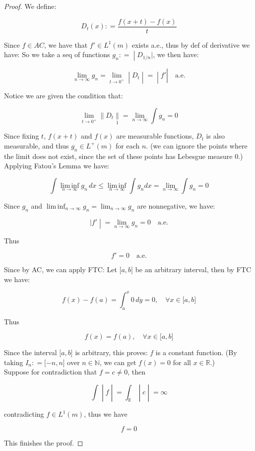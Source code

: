 \documentclass{qlnotes-export}
\begin{document}
\begin{proof}

We define:

\[D_{t}(x): = \frac{f(x + t) - f(x)}{t}\]

Since \(f \in AC\), we have that \(f' \in L^{1}(m)\) exists a.e., thus by def of derivative we have: So we take a seq of functions \(\left. g_{n}: = \middle| D_{1/n}| \right.\), we then have:

\[\left. \lim\limits_{n\rightarrow\infty}g_{n} = \lim\limits_{t\rightarrow 0^{+}} \middle| D_{t} \middle| = \middle| f' \right|\quad\text{a.e.}\]

Notice we are given the condition that:

\[\lim\limits_{t\rightarrow 0^{+}} \parallel D_{t}\underset{1}{\parallel} = \lim\limits_{n\rightarrow\infty}\int g_{n} = 0\]

Since fixing \(t\), \(f(x + t)\) and \(f(x)\) are measurable functions, \(D_{t}\) is also measurable, and thus \(g_{n} \in L^{+}(m)\) for each \(n\). (we can ignore the points where the limit does not exist, since the set of these points has Lebesgue measure \(0\).)\\
Applying Fatou's Lemma we have:

\[\int\operatorname{lim\, inf}\limits_{n\rightarrow\infty}g_{n}\, dx \leq \operatorname{lim\, inf}\limits_{n\rightarrow\infty}\int g_{n}dx = \lim\limits_{n\rightarrow\infty}\int g_{n} = 0\]

Since \(g_{n}\) and \(\operatorname{lim\, inf}_{n\rightarrow\infty}g_{n} = \lim_{n\rightarrow\infty}g_{n}\) are nonnegative, we have:

\[\left. |f' \middle| = \lim\limits_{n\rightarrow\infty}g_{n} = 0\quad\text{a.e.} \right.\]

Thus

\[f' = 0\quad\text{a.e.}\]

Since by AC, we can apply FTC: Let \(\lbrack a,b\rbrack\) be an arbitrary interval, then by FTC we have:

\[f(x) - f(a) = \int_{a}^{x}0\, dy = 0,\quad\forall x \in \lbrack a,b\rbrack\]

Thus

\[f(x) = f(a),\quad\forall x \in \lbrack a,b\rbrack\]

Since the interval \(\lbrack a,b\rbrack\) is arbitrary, this proves: \(f\) is a constant function. (By taking \(I_{n}: = \lbrack - n,n\rbrack\) over \(n \in {\mathbb{N}}\), we can get \(f(x) = 0\) for all \(x \in {\mathbb{R}}\).)\\
Suppose for contradiction that \(f = c \neq 0\), then

\[\left. \int \middle| f \middle| = \int_{\mathbb{R}} \middle| c \middle| = \infty \right.\]

contradicting \(f \in L^{1}(m)\), thus we have

\[f = 0\]

This finishes the proof.

\end{proof}
\end{document}
